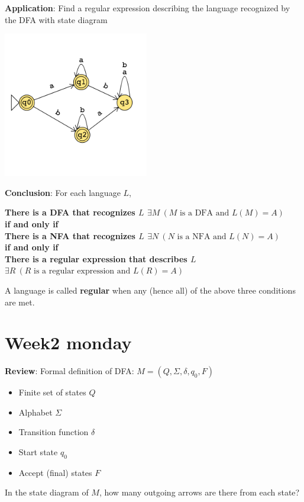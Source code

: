 \documentclass[12pt, oneside]{article}
\begin{document}
{\bf Application}: Find a regular expression describing the language recognized by the DFA with 
state diagram

\includegraphics[width=2.5in]{../../resources/machines/Lect6NFA3.png}

\vfill


\newpage

{\bf Conclusion}: For each language $L$,
\begin{center}
    {\bf There is a DFA that recognizes $L$ \qquad $\exists M ~(M \textrm{ is a DFA and } L(M) = A)$}\\
    {\bf if and only if}\\
    {\bf There is a NFA that recognizes $L$  \qquad $\exists N ~(N \textrm{ is a NFA and } L(N) = A)$}\\
    {\bf if and only if}\\
    {\bf There is a regular expression that describes $L$ $\exists R ~(R \textrm{ is a regular expression and } L(R) = A)$}\\
\end{center}

A language is called {\bf regular} when any (hence all) of the above three conditions are met. \vfill
\section*{Week2 monday}



{\bf Review}: Formal definition of DFA: $M = (Q, \Sigma, \delta, q_0, F)$ 

\begin{center}
\begin{multicols}{2}
\begin{itemize}
\setlength{\itemsep}{2pt}
\item Finite set of states $Q$
\item Alphabet $\Sigma$
\item Transition function $\delta$
\item Start state $q_0$
\item Accept (final) states $F$
\end{itemize}
\end{multicols}
\end{center}
In the state diagram of $M$, how many outgoing arrows are there from each state?
\end{document}
